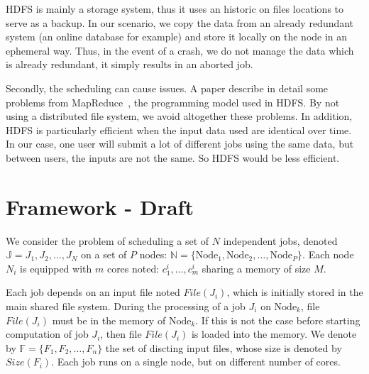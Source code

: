 \documentclass[conference,10pt]{IEEEtran}
\newcommand{\Node}[1]{\ensuremath{\mathrm{Node}_{#1}}\xspace}
\newcommand{\file}{\ensuremath{\mathit{File}}\xspace}
\newcommand{\size}{\ensuremath{\mathit{Size}}\xspace}
\newcommand{\fileset}{\ensuremath{\mathbb{F}}\xspace}
\newcommand{\jobset}{\ensuremath{\mathbb{J}}\xspace}
\newcommand{\nodeset}{\ensuremath{\mathbb{N}}\xspace}
\begin{document}
HDFS is mainly a storage system, thus it uses an historic on files locations to serve as a backup. 
In our scenario, we copy the data from an already redundant system (an online database for example) and store it locally on the node in an ephemeral way. Thus, in the event of a crash, we do not manage the data which is already redundant, it simply results in an aborted job.

Secondly, the scheduling can cause issues. A paper describe in detail some problems from
MapReduce~\cite{issue_with_hdfs}, the programming model used in HDFS.
By not using a distributed file system, we avoid altogether these problems. 
In addition, HDFS is particularly efficient when the input data used are identical over time.
In our case, one user will submit a lot of different jobs using the same data, but between users,
the inputs are not the same. So HDFS would be less efficient.

\section{Framework - Draft}\label{sec.framework}

We consider the problem of scheduling a set of $N$ independent jobs,
denoted $\jobset = {J_1, J_2, \ldots, J_N}$ on a set of $P$ nodes:
$\nodeset = \{\Node{1}, \Node{2}, \ldots, \Node{P}\}$.
Each node $N_i$ is equipped with $m$ cores noted:
$c^i_1,\ldots,c^i_m$ sharing a memory of size $M$.

Each job depends on an input file noted $\file(J_i)$, which is
initially stored in the main shared file system.  During the
processing of a job $J_i$ on $\Node{k}$, file $\file(J_i)$ must be in
the memory of $\Node{k}$. If this is not the case before starting
computation of job $J_i$, then file $\file(J_i)$ is loaded into the
memory.  We denote by $\fileset = \{F_1, F_2, \ldots, F_n\}$ the set
of discting input files, whose size is denoted by $\size(F_i)$. Each
job runs on a single node, but on different number of cores.
\end{document}
